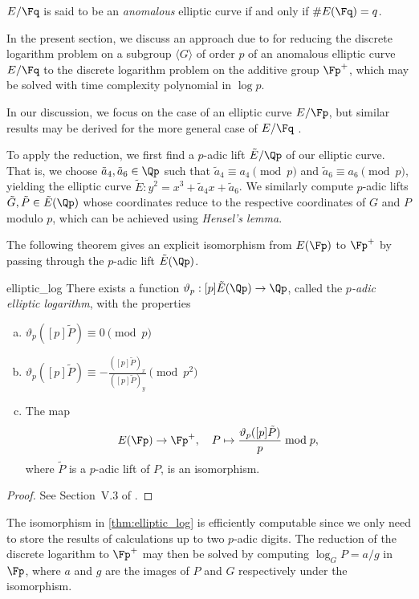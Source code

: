 \begin{dfn}{}{}
$E / \Fq$ is said to be an \emph{anomalous} elliptic curve if and only if $\#E(\Fq) = q$.
\end{dfn}

In the present section, we discuss an approach due to \citep{Smart} for reducing the discrete logarithm problem on a subgroup $\langle G \rangle$ of order $p$ of an anomalous elliptic curve $E / \Fq$ to the discrete logarithm problem on the additive group $\Fp^+$, which may be solved with time complexity polynomial in $\log p$.

In our discussion, we focus on the case of an elliptic curve $E / \Fp$, but similar results may be derived for the more general case of $E / \Fq$ \citep{Washington}.

To apply the reduction, we first find a $p$-adic lift $\tilde{E} / \Qp$ of our elliptic curve. That is, we choose $\tilde{a}_4, \tilde{a}_6 \in \Qp$ such that $\tilde{a}_4 \equiv a_4 \pmod{p}$ and $\tilde{a}_6 \equiv a_6 \pmod{p}$, yielding the elliptic curve $\tilde{E} : y^2 = x^3 + \tilde{a}_4 x + \tilde{a}_6$. We similarly compute $p$-adic lifts $\tilde{G}, \tilde{P} \in \tilde{E}(\Qp)$ whose coordinates reduce to the respective coordinates of $G$ and $P$ modulo $p$, which can be achieved using \emph{Hensel's lemma}.

The following theorem gives an explicit isomorphism from $E(\Fp)$ to $\Fp^+$ by passing through the $p$-adic lift $\tilde{E}(\Qp)$.

\begin{thm}{}{elliptic_log}
There exists a function $\vartheta_p : [p] \tilde{E}(\Qp) \to \Qp$, called the \emph{$p$-adic elliptic logarithm}, with the properties
\begin{enumerate}[(a)]
\item $\vartheta_p([p] \tilde{P}) \equiv 0 \pmod{p}$
\item $\vartheta_p([p] \tilde{P}) \equiv - \frac{([p] \tilde{P})_x}{([p] \tilde{P})_y} \pmod{p^2}$
\item The map
\[E(\Fp) \to \Fp^+, \quad P \mapsto \frac{\vartheta_p([p] \tilde{P})}{p} \bmod{p}, \]
where $\tilde{P}$ is a $p$-adic lift of $P$, is an isomorphism.
\end{enumerate}
\end{thm}
\begin{proof}
See Section~V.3 of \citep{BlakeSeroussiSmart}.
\end{proof}

The isomorphism in \cref{thm:elliptic_log} is efficiently computable since we only need to store the results of calculations up to two $p$-adic digits. The reduction of the discrete logarithm to $\Fp^+$ may then be solved by computing $\log_G P = a / g$ in $\Fp$, where $a$ and $g$ are the images of $P$ and $G$ respectively under the isomorphism.

